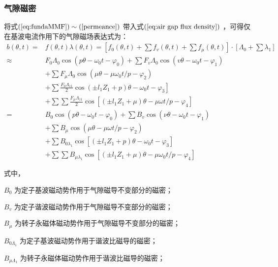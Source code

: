 \documentclass[11pt,a4paper]{article}
\begin{document}
\subsubsection{气隙磁密}
将式$ \left( \ref{eq:fundaMMF}\right) \sim \left( \ref{permeance}\right) $ 带入式$ \left( \ref{eq:air gap flux density}\right) $ ，可得仅在基波电流作用下的气隙磁场表达式为：
\begin{equation}\label{complete flux density}
\begin{aligned}
b(\theta, t)=& f(\theta, t) \lambda(\theta, t)=\left[f_{0}(\theta, t)+\sum f_{v}(\theta, t)+\sum f_{\mu}(\theta, t)\right] \cdot\left[\Lambda_{0}+\sum \lambda_{1}\right] \\
\approx & F_{0} \Lambda_{0} \cos \left(p \theta-\omega_{0} t-\varphi_{0}\right)
+\sum F_{v} \Lambda_{0} \cos \left(v \theta-\omega_{0} t-\varphi_{1}\right)\\
&+\sum F_{\mu} \Lambda_{0} \cos \left(\mu \theta-\mu \omega_{0} t / p-\varphi_{2}\right) \\
&\left.+\sum \frac{F_{0} \Lambda_{11}}{2} \cos \left(\pm l_{1} Z_{1}+p\right) \theta-\omega_{0} t-\varphi_{3}\right]\\
&+\sum \sum \frac{F_{\mu} \Lambda_{11}}{2} \cos \left[\left(\pm l_{1} Z_{1}+\mu\right) \theta-\mu \omega t / p-\varphi_{4}\right] \\
=& B_{0} \cos \left(p \theta-\omega_{0} t-\varphi_{0}\right)+\sum B_{v} \cos \left(\nu \theta-\omega_{0} t-\varphi_{1}\right)\\
&+\sum B_{\mu} \cos \left(\mu \theta-\mu \omega t / p-\varphi_{2}\right) \\
&+\sum B_{0 \lambda_{1}} \cos \left[\left( \pm l_{1} Z_{1}+p\right) \theta-\omega_{0} t-\varphi_{3}\right]\\
& +\sum \sum B_{\mu \lambda_{1}} \cos \left[ \left(\pm l_{1} Z_{1}+\mu\right) \theta-\mu \omega_{0} t / p-\varphi_{4}\right]
\end{aligned}
\end{equation}
\par
式中，\par
$ B_{0} $ 为定子基波磁动势作用于气隙磁导不变部分的磁密；\par
$ B_{v} $ 为定子谐波磁动势作用于气隙磁导不变部分的磁密；\par
$ B_{\mu} $ 为转子永磁体磁动势作用于气隙磁导不变部分的磁密；\par
$ B_{0\Lambda_{1}} $ 为定子基波磁动势作用于谐波比磁导的磁密；\par
$ B_{\mu\Lambda_{1}} $ 为转子永磁体磁动势作用于谐波比磁导的磁密；\par
\end{document}
